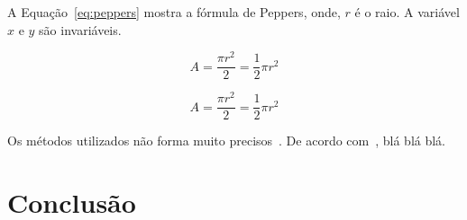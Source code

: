 \documentclass[a4paper,12pt]{article}
\begin{document}
\lipsum[4]

A Equação~\ref{eq:peppers} mostra a fórmula de Peppers, onde, $r$ é o raio. A variável $x$ e $y$ são invariáveis.

\begin{equation}
\label{eq:peppers}
A = \frac{\pi r^2}{2} = \frac{1}{2} \pi r^2   
\end{equation}

\lipsum[4]

$$
A = \frac{\pi r^2}{2} = \frac{1}{2} \pi r^2   
$$

\lipsum[4]

Os métodos utilizados não forma muito precisos~\cite{ref:darwin1872, ref:ross2006}.
De acordo com~, blá blá blá.


\section{Conclusão}

\lipsum[4]


\end{document}
